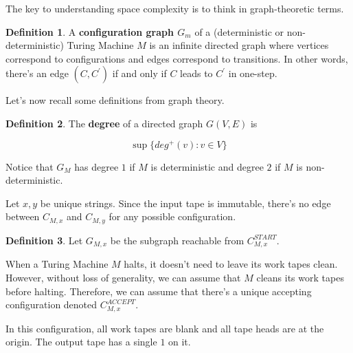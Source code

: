 \documentclass{article}
\theoremstyle{definition}
\newtheorem{definition}{Definition}
\begin{document}
The key to understanding space complexity is to think in graph-theoretic terms.

\begin{definition}
    A \textbf{configuration graph $G_{m}$} of a (deterministic or non-deterministic) Turing Machine $M$ is an infinite directed graph where vertices correspond to configurations and edges correspond to transitions. In other words, there's an edge $(C,C^{\prime})$ if and only if $C$ leads to $C^{\prime}$ in one-step.
\end{definition}

Let's now recall some definitions from graph theory.

\begin{definition}
    The \textbf{degree} of a directed graph $G(V,E)$ is 

    \[ \sup\{ deg^{+}(v) : v \in V\}\]
\end{definition}

Notice that $G_{M}$ has degree $1$ if $M$ is deterministic and degree $2$ if $M$ is non-deterministic.

Let $x,y$ be unique strings. Since the input tape is immutable, there's no edge between $C_{M,x}$ and $C_{M,y}$ for any possible configuration.

\begin{definition}
    Let $G_{M,x}$ be the subgraph reachable from $C^{START}_{M,x}$. 
\end{definition}

When a Turing Machine $M$ halts, it doesn't need to leave its work tapes clean. However, without loss of generality, we can assume that $M$ cleans its work tapes before halting. Therefore, we can assume that there's a unique accepting configuration denoted $C^{ACCEPT}_{M,x}$.

In this configuration, all work tapes are blank and all tape heads are at the origin.
The output tape has a single $1$ on it.
\end{document}
